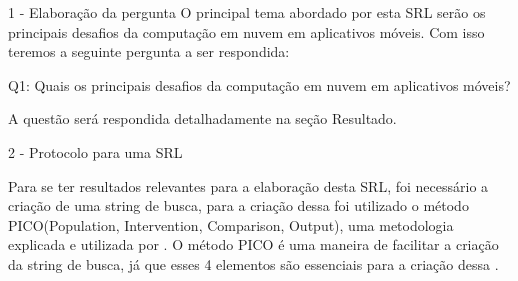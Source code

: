 \documentclass[12pt]{article}
\begin{document}
1 - Elaboração da pergunta
O principal tema abordado por esta SRL serão os principais desafios da computação em nuvem em aplicativos móveis. Com isso teremos a seguinte pergunta a ser respondida:

Q1: Quais os principais desafios da computação em nuvem em aplicativos móveis?

A questão será respondida detalhadamente na seção Resultado.

2 - Protocolo para uma SRL

Para se ter resultados relevantes para a elaboração desta SRL, foi necessário a criação de uma string de busca, para a criação dessa foi utilizado o método PICO(Population, Intervention, Comparison, Output), uma metodologia explicada e utilizada por \cite{SANTOS2007}. O método PICO é uma maneira de facilitar a criação da string de busca, já que esses 4 elementos são essenciais para a criação dessa \cite{SANTOS2007}.






\end{document}
